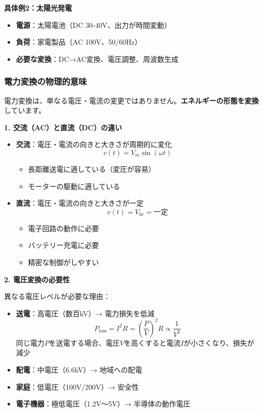 \begin{screen}
\textbf{具体例2：太陽光発電}

\begin{itemize}
\item \textbf{電源}：太陽電池（DC 30-40V、出力が時間変動）
\item \textbf{負荷}：家電製品（AC 100V、50/60Hz）
\item \textbf{必要な変換}：DC→AC変換、電圧調整、周波数生成
\end{itemize}
\end{screen}

\subsubsection{電力変換の物理的意味}

電力変換は、単なる電圧・電流の変更ではありません。\textbf{エネルギーの形態を変換}しています。

\textbf{1. 交流（AC）と直流（DC）の違い}

\begin{itemize}
\item \textbf{交流}：電圧・電流の向きと大きさが周期的に変化
\begin{equation}
v(t) = V_m \sin(\omega t)
\end{equation}
\begin{itemize}
\item 長距離送電に適している（変圧が容易）
\item モーターの駆動に適している
\end{itemize}

\item \textbf{直流}：電圧・電流の向きと大きさが一定
\begin{equation}
v(t) = V_{\text{dc}} = \text{一定}
\end{equation}
\begin{itemize}
\item 電子回路の動作に必要
\item バッテリー充電に必要
\item 精密な制御がしやすい
\end{itemize}
\end{itemize}

\textbf{2. 電圧変換の必要性}

異なる電圧レベルが必要な理由：

\begin{itemize}
\item \textbf{送電}：高電圧（数百kV）→ 電力損失を低減
\begin{equation}
P_{\text{loss}} = I^2 R = \left(\frac{P}{V}\right)^2 R \propto \frac{1}{V^2}
\end{equation}
同じ電力$P$を送電する場合、電圧$V$を高くすると電流$I$が小さくなり、損失が減少

\item \textbf{配電}：中電圧（6.6kV）→ 地域への配電

\item \textbf{家庭}：低電圧（100V/200V）→ 安全性

\item \textbf{電子機器}：極低電圧（1.2V〜5V）→ 半導体の動作電圧
\end{itemize}

